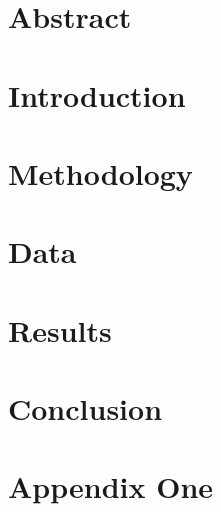 \documentclass[a4paper,11pt]{report}
\begin{document}


\chapter*{Abstract}


\tableofcontents
\newpage

\chapter{Introduction}


\chapter{Methodology}


\chapter{Data}


\chapter{Results}


\chapter{Conclusion}


\appendix
\chapter{Appendix One}


\printbibliography
\end{document}
